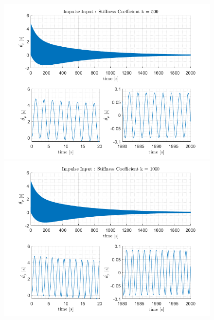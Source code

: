 \documentclass[letterpaper,12pt]{article}
\begin{document}
\begin{figure}[ht]
    \centering
    \includegraphics[scale = .8]{Images/Impulse_k500.png}
    \includegraphics[scale = .8]{Images/Impulse_k1000.png}
\end{figure}
\end{document}
